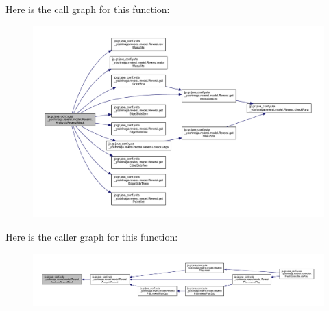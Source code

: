 Here is the call graph for this function\+:\nopagebreak
\begin{figure}[H]
\begin{center}
\leavevmode
\includegraphics[width=350pt]{classjp_1_1gr_1_1java__conf_1_1yuta__yoshinaga_1_1reversi_1_1model_1_1_reversi_adb74246f49150e02201766a1fa6cf732_cgraph}
\end{center}
\end{figure}
Here is the caller graph for this function\+:\nopagebreak
\begin{figure}[H]
\begin{center}
\leavevmode
\includegraphics[width=350pt]{classjp_1_1gr_1_1java__conf_1_1yuta__yoshinaga_1_1reversi_1_1model_1_1_reversi_adb74246f49150e02201766a1fa6cf732_icgraph}
\end{center}
\end{figure}
\mbox{\label{classjp_1_1gr_1_1java__conf_1_1yuta__yoshinaga_1_1reversi_1_1model_1_1_reversi_a519adbc5ec3bf5433fdb79bf8049cc75}} 
